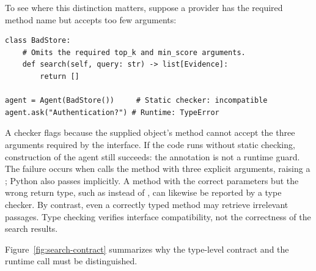 To see where this distinction matters, suppose a provider has the required method name but accepts too few arguments:

\begin{lstlisting}[caption={A method signature that does not satisfy the contract},label={lst:bad-provider}]
class BadStore:
    # Omits the required top_k and min_score arguments.
    def search(self, query: str) -> list[Evidence]:
        return []

agent = Agent(BadStore())     # Static checker: incompatible
agent.ask("Authentication?") # Runtime: TypeError
\end{lstlisting}

A checker flags  because the supplied object's  method cannot accept the three arguments required by the interface. If the code runs without static checking, construction of the agent still succeeds: the annotation is not a runtime guard. The failure occurs when  calls the method with three explicit arguments, raising a ; Python also passes  implicitly. A method with the correct parameters but the wrong return type, such as  instead of , can likewise be reported by a type checker. By contrast, even a correctly typed method may retrieve irrelevant passages. Type checking verifies interface compatibility, not the correctness of the search results.

Figure~\ref{fig:search-contract} summarizes why the type-level contract and the runtime call must be distinguished.

